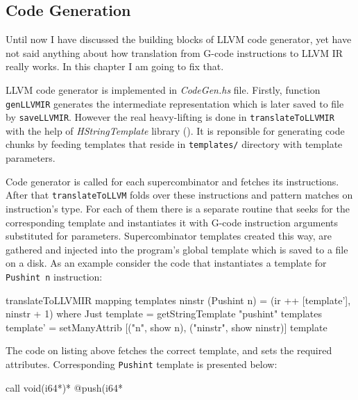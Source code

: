 \documentclass[12pt,a4paper]{report}
\begin{document}
\subsection{Code Generation}
Until now I have discussed the building blocks of LLVM code generator, yet
have not said anything about how translation from G-code instructions to LLVM IR
really works. In this chapter I am going to fix that.

LLVM code generator is implemented in \textit{CodeGen.hs} file. Firstly,
function \texttt{genLLVMIR} generates the intermediate representation which is
later saved to file by \texttt{saveLLVMIR}. However the real heavy-lifting is
done in \texttt{translateToLLVMIR} with the help of \textit{HStringTemplate}
library (\cite{website:hstring_template}). It is reponsible for generating code
chunks by feeding templates that reside in \texttt{templates/} directory with
template parameters.

Code generator is called for each supercombinator and fetches its instructions.
After that \texttt{translateToLLVM} folds over these instructions and pattern
matches on instruction's type. For each of them there is a separate routine
that seeks for the corresponding template and instantiates it with G-code
instruction arguments substituted for parameters. Supercombinator templates
created this way, are gathered and injected into the program's global template
which is saved to a file on a disk. As an example consider the code that
instantiates a template for \texttt{Pushint n} instruction:

\vspace*{0.2in}
\begin{code}[style=haskell]
  translateToLLVMIR mapping templates ninstr (Pushint n) =
      (ir ++ [template'], ninstr + 1)
      where
          Just template = getStringTemplate "pushint" templates
          template' = setManyAttrib
                  [("n", show n), ("ninstr", show ninstr)]
                  template
\end{code}

The code on listing above fetches the correct template, and sets the required
attributes. Corresponding \texttt{Pushint} template is presented below:

\vspace*{0.2in}
\begin{code}[style=assembler]
  call void(i64*)* @push(i64* %
\end{code}
\end{document}

